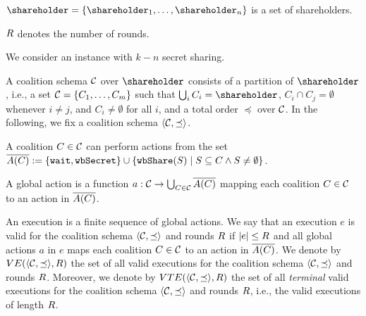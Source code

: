 %
$\shareholder = \{\shareholder_1, \ldots, \shareholder_n\}$ is a set of shareholders.

%
$R$ denotes the number of rounds.

%
We consider an \shortname instance with $k-n$ secret sharing.

%
A coalition schema $\mathcal{C}$ over $\shareholder$ consists of a partition of $\shareholder$, i.e., a set $\mathcal{C} = \{ C_1, \ldots, C_m\}$ such that $\bigcup_{i}C_i = \shareholder$, $C_i \cap C_j = \emptyset$ whenever $i \neq j$, and $C_i \neq \emptyset$ for all $i$, and a total order $\preceq$ over $\mathcal{C}$.
%
In the following, we fix a coalition schema $\langle \mathcal{C},\preceq \rangle$.


%
A coalition $C \in \mathcal{C}$ can perform actions from the set $\overline{A(C)} := \{\mathtt{wait}, \mathtt{wbSecret} \} \cup \{ \mathtt{wbShare}(S) \mid S \subseteq C \wedge S \neq \emptyset\}$. %

%
A global action is a function $a: \mathcal{C} \to \bigcup_{C \in \mathcal{C}} \overline{A(C)}$ mapping each coalition $C \in \mathcal{C}$ to an action in $\overline{A(C)}$.

%
An execution is a finite sequence of global actions.
%
%
%
We say that an execution $e$ is valid for the coalition schema $\langle \mathcal{C},\preceq \rangle$ and rounds $R$ if $|e| \leq R$ and all global actions $a$ in $e$ maps each coalition $C \in \mathcal{C}$ to an action in $\overline{A(C)}$.
%
We denote by $VE(\langle \mathcal{C},\preceq \rangle,R)$ the set of all valid executions for the coalition schema $\langle \mathcal{C},\preceq \rangle$ and rounds $R$.
%
Moreover, we denote by $VTE(\langle \mathcal{C},\preceq \rangle,R)$ the set of all \textit{terminal} valid executions for the coalition schema $\langle \mathcal{C},\preceq \rangle$ and rounds $R$, i.e., the valid executions of length $R$.


